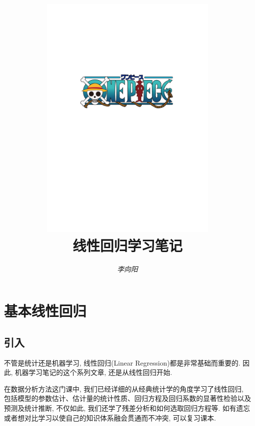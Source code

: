 \documentclass[a4paper,UTF8]{ctexart}
\theoremstyle{plain} \newtheorem{theorem}{定理}[section]
\theoremstyle{plain} \newtheorem{definition}{定义}[section]
\theoremstyle{plain} \newtheorem{lemma}{引理}[section]
\theoremstyle{plain} \newtheorem{proposition}{命题}[section]
\theoremstyle{plain} \newtheorem{example}{例}[section]
\theoremstyle{plain} \newtheorem{remark}{注}[section]
\theoremstyle{plain} \newtheorem{corollary}{推论}[section]
\begin{document}
\title{
\includegraphics[width=0.65\textwidth]{onepiece.pdf}\\
\vspace{2em}
\textbf{线性回归学习笔记}}
\author{\emph{李向阳}  \color{blue}{d1142845997@gmail.com}
}
\date{}

\maketitle
\thispagestyle{empty}

\newpage


\tableofcontents

\newpage

\section{基本线性回归}
\subsection{引入}
不管是统计还是机器学习, 线性回归(Linear Regression)都是非常基础而重要的. 因此, 机器学习笔记的这个系列文章, 还是从线性回归开始.

在数据分析方法这门课中, 我们已经详细的从经典统计学的角度学习了线性回归, 包括模型的参数估计、估计量的统计性质、回归方程及回归系数的显著性检验以及预测及统计推断, 不仅如此, 我们还学了残差分析和如何选取回归方程等. 如有遗忘或者想对比学习以使自己的知识体系融会贯通而不冲突, 可以复习课本.
\end{document}
